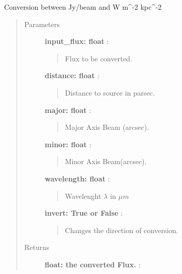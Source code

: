 \documentclass[a4paper,10pt,english]{sphinxmanual}
\begin{document}
\begin{fulllineitems}
\label{functions:astrolyze.functions.units.JyBToWM2Kpc2}
Conversion between Jy/beam and W m\textasciicircum{}-2 kpc\textasciicircum{}-2
\begin{quote}\begin{description}
\item[{Parameters }] \leavevmode
\textbf{input\_flux:  float} :
\begin{quote}

Flux to be converted.
\end{quote}

\textbf{distance: float} :
\begin{quote}

Distance to source in parsec.
\end{quote}

\textbf{major: float} :
\begin{quote}

Major Axis Beam (arcsec).
\end{quote}

\textbf{minor: float} :
\begin{quote}

Minor Axis Beam(arcsec).
\end{quote}

\textbf{wavelength: float} :
\begin{quote}

Wavelenght $\lambda$ in $\mu m$
\end{quote}

\textbf{invert: True or False} :
\begin{quote}

Changes the direction of conversion.
\end{quote}

\item[{Returns }] \leavevmode
\textbf{float: the converted Flux.} :

\end{description}\end{quote}

\end{fulllineitems}

\end{document}

